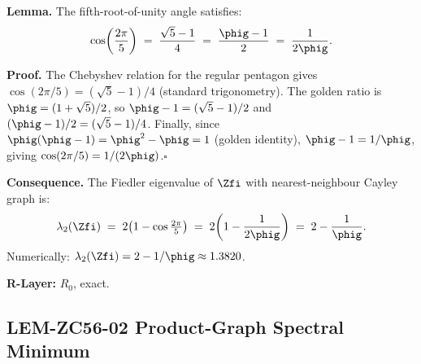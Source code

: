 \documentclass[12pt, a4paper]{article}
\begin{document}
\begin{formalbox}[title={LEM-ZC56-01: $\cos(2\pi/5)=1/(2\phig)$
  --- Golden Ratio in $\mathbb{Z}_5$ ($R_0$, Exact)}]
\textbf{Lemma.}
The fifth-root-of-unity angle satisfies:
\begin{equation}
  \cos\!\left(\frac{2\pi}{5}\right)
  \;=\; \frac{\sqrt{5}-1}{4}
  \;=\; \frac{\phig-1}{2}
  \;=\; \frac{1}{2\phig}.
  \label{eq:cos-phi}
\end{equation}

\textbf{Proof.}
The Chebyshev relation for the regular pentagon gives
$\cos(2\pi/5)=(\sqrt{5}-1)/4$ (standard trigonometry).
The golden ratio is $\phig=(1+\sqrt{5})/2$, so
$\phig-1=(\sqrt{5}-1)/2$ and $(\phig-1)/2=(\sqrt{5}-1)/4$.
Finally, since $\phig(\phig-1)=\phig^2-\phig=1$
(golden identity), $\phig-1=1/\phig$, giving
$\cos(2\pi/5)=1/(2\phig)$.\hfill$\square$

\medskip
\textbf{Consequence.}
The Fiedler eigenvalue of $\Zfi$ with nearest-neighbour
Cayley graph is:
\begin{equation}
  \lambda_2(\Zfi)
  \;=\; 2\!\left(1-\cos\tfrac{2\pi}{5}\right)
  \;=\; 2\!\left(1-\frac{1}{2\phig}\right)
  \;=\; 2-\frac{1}{\phig}.
  \label{eq:lam2-Z5}
\end{equation}
Numerically: $\lambda_2(\Zfi)=2-1/\phig\approx1.3820$.

\textbf{R-Layer:} $R_0$, exact.
\end{formalbox}

\subsection{LEM-ZC56-02 \quad Product-Graph Spectral Minimum}
\label{sec:lem02}

\end{document}
